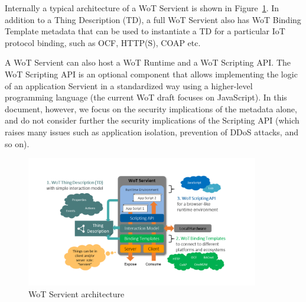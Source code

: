 Internally a typical architecture of a WoT Servient is shown in Figure~\ref{fig-fservient}. 
In addition to a Thing Description (TD), a full WoT Servient also has WoT Binding Template 
metadata that can be used to instantiate a TD for a particular IoT protocol binding, 
such as OCF, HTTP(S), COAP etc. 

A WoT Servient can also host a WoT Runtime and a WoT Scripting API.
The WoT Scripting API is an optional component that allows 
implementing the logic of an application Servient in a standardized way
using a higher-level programming language (the current WoT draft focuses on JavaScript). 
In this document, however, we focus on the security implications of the metadata alone,
and do not consider further the security implications of the Scripting API (which
raises many issues such as application isolation, prevention of DDoS attacks, and so on).

\begin{figure}[!t]
\centering
\includegraphics[width=4in]{figures/wot-servient.png}
\caption{WoT Servient architecture}
\label{fig-fservient}
\end{figure}


